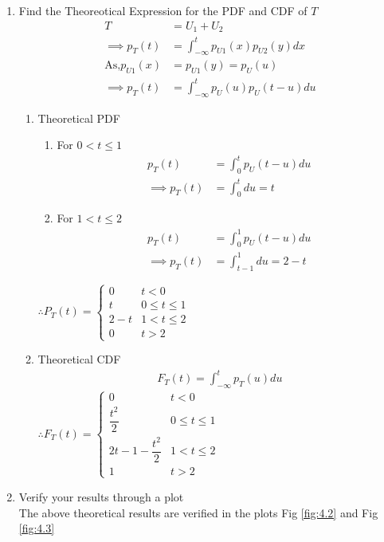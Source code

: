 \documentclass[journal,12pt,twocolumn]{IEEEtran}
\renewcommand\thesection{\arabic{section}}
\begin{document}
\begin{enumerate}[label=\thesection.\arabic*
,ref=\thesection.\theenumi]
\item Find the Theoreotical Expression for the PDF and CDF of $T$\\
\solution
\begin{align}
    T&=U_1+U_2\\
    \implies p_T(t)&=\int_{-\infty}^{t}p_{U1}(x)p_{U2}(y)dx\\
    \text{As,}p_{U1}(x)&=p_{U1}(y)=p_{U}(u)\\
    \implies p_T(t)&=\int_{-\infty}^{t}p_{U}(u)p_{U}(t-u)du
    \end{align}
    \begin{enumerate}
        \item Theoretical PDF 
        \begin{enumerate}
            \item For $0 < t\le 1$
            \begin{align}
                p_T(t)&=\int_{0}^{t}p_{U}(t-u)du\\
                \implies p_T(t)&=\int_{0}^{t} du=t
            \end{align}
            \item For $1 < t \le 2$
             \begin{align}
                p_T(t)&=\int_{0}^{1}p_{U}(t-u)du\\
                \implies p_T(t)&=\int_{t-1}^{1} du=2-t
            \end{align}
        \end{enumerate}
        $\therefore P_T(t) =
        \begin{cases}
         0     & t<0 \\
         t     &0 \le t \le 1 \\
         2-t   &1 < t \le 2\\
         0     &t>2
        \end{cases}
        $\\
        \item Theoretical CDF 
        \begin{align}
            F_T(t)=\int_{-\infty}^{t}p_T(u)du
        \end{align}
        $\therefore
            F_{T}(t)=
            \begin{cases}
             0   &t<0\\
             \dfrac{t^2}{2} &0\le t \le 1\\
             2t-1-\dfrac{t^2}{2} &1<t \le 2\\
             1 &t>2
            \end{cases}
            $\\
    \end{enumerate}
    
\item Verify your results through a plot \\
\solution The above theoretical results are verified in the plots
Fig \ref{fig:4.2} and Fig \ref{fig:4.3}
\end{enumerate}
\end{document}
